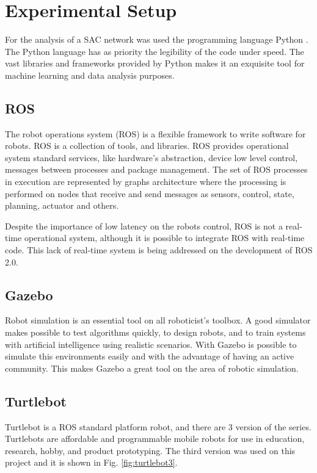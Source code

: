 \section{Experimental Setup}

For the analysis of a SAC network was used the programming language Python \cite{ascher1999learning}. 
The Python language has as priority the legibility of the code under speed. 
The vast libraries and frameworks provided by Python makes it an exquisite tool for machine learning and data analysis purposes.

\subsection{ROS}

The robot operations system (ROS) is a flexible framework to write software for robots.
ROS \cite{pyo2015ros} is a collection of tools, and libraries.
ROS provides operational system standard services, like hardware's abstraction, device low level control, messages between processes and package management. 
The set of ROS processes in execution are represented by graphs architecture where the processing is performed on nodes that receive and send messages as sensors, control, state, planning, actuator and others.

Despite the importance of low latency on the robots control, ROS is not a real-time operational system, although it is possible to integrate ROS with real-time code. This lack of real-time system is being addressed on the development of ROS 2.0.

\subsection{Gazebo}

Robot simulation is an essential tool on all roboticist's toolbox.
A good simulator makes possible to test algorithms quickly, to design robots, and to train systems with artificial intelligence using realistic scenarios.
With Gazebo \cite{fairchild2016ros} is possible to simulate this environments easily and with the advantage of having an active community.
This makes Gazebo a great tool on the area of robotic simulation.

\subsection{Turtlebot}

Turtlebot is a ROS standard platform robot, and there are 3 version of the series. Turtlebots are affordable and programmable mobile robots for use in education, research, hobby, and product prototyping.
The third version was used on this project and it is shown in Fig. \ref{fig:turtlebot3}.

